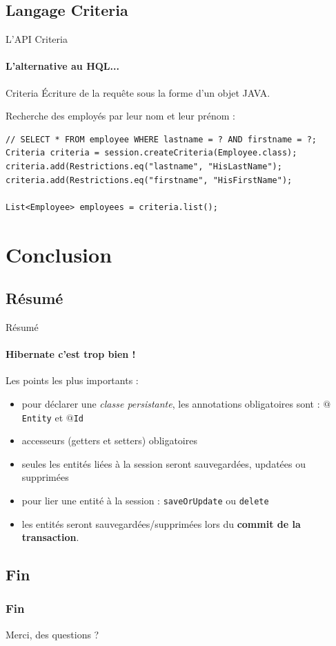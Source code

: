 \documentclass[compact]{beamer}%
\begin{document}
\subsection{Langage Criteria}

\begin{frame}[fragile]{L'API Criteria}
	\framesubtitle{L'alternative au HQL...}

	\begin{block}{Criteria}
		Écriture de la requête sous la forme d'un objet JAVA.
	\end{block}		
	
	\pause
	Recherche des employés par leur nom et leur prénom :
	\begin{lstlisting}
// SELECT * FROM employee WHERE lastname = ? AND firstname = ?;
Criteria criteria = session.createCriteria(Employee.class);
criteria.add(Restrictions.eq("lastname", "HisLastName");
criteria.add(Restrictions.eq("firstname", "HisFirstName");

List<Employee> employees = criteria.list();
	\end{lstlisting}

\end{frame}
	
	
	
\section{Conclusion}

\subsection{Résumé}
\begin{frame}{Résumé}
	\framesubtitle{Hibernate c'est trop bien !}
	Les points les plus importants :
	\begin{itemize}[<+->]
		\item pour déclarer une  \emph{classe persistante}, les annotations obligatoires sont : \texttt{$@$Entity} et \texttt{$@$Id}
		\item accesseurs (getters et setters) obligatoires
		\item seules les entités liées à la session seront sauvegardées, updatées ou supprimées
		\item pour lier une entité à la session : \texttt{saveOrUpdate} ou \texttt{delete}
		\item les entités seront sauvegardées/supprimées lors du \textbf{commit de la transaction}.
	\end{itemize}
\end{frame}
	
\subsection{Fin}
\begin{frame}
	\frametitle{Fin}
	\begin{center}
		\huge
		Merci, des questions ?
	\end{center}
\end{frame}
\end{document}
